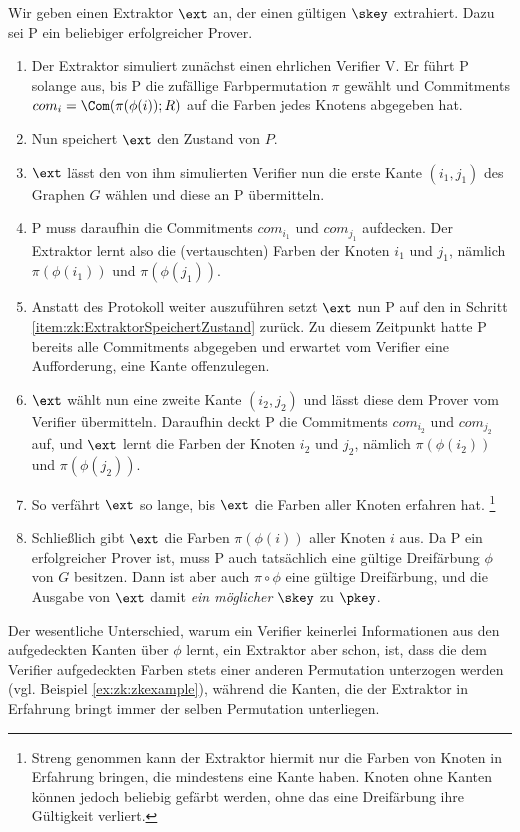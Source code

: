 \begin{beweis}
  Wir geben einen Extraktor $\ext$ an, der einen gültigen $\skey$ extrahiert. Dazu sei P ein beliebiger erfolgreicher Prover.
  
  \begin{enumerate}
  \item Der Extraktor simuliert zunächst einen ehrlichen Verifier V. Er
    führt P solange aus, bis P die zufällige Farbpermutation $\pi$
    gewählt und Commitments $com_i = \Com(\pi(\phi(i));R)$ auf die
    Farben jedes Knotens abgegeben hat.	 
  \item \label{item:zk:ExtraktorSpeichertZustand}
    Nun speichert $\ext$ den Zustand von $P$.
  \item $\ext$ lässt den von ihm simulierten Verifier nun die erste
    Kante $(i_1, j_1)$ des Graphen $G$ wählen und diese an P
    übermitteln.
  \item P muss daraufhin die Commitments $com_{i_1}$ und $com_{j_1}$
    aufdecken. Der Extraktor lernt also die (vertauschten) Farben der
    Knoten $i_1$ und $j_1$, nämlich $\pi(\phi(i_1))$ und
    $\pi(\phi(j_1))$.
  \item Anstatt des Protokoll weiter auszuführen setzt $\ext$ nun P auf
    den in Schritt \ref{item:zk:ExtraktorSpeichertZustand} zurück. Zu
    diesem Zeitpunkt hatte P bereits alle Commitments abgegeben und
    erwartet vom Verifier eine Aufforderung, eine Kante offenzulegen.
  \item $\ext$ wählt nun eine zweite Kante $(i_2, j_2)$ und lässt diese
    dem Prover vom Verifier übermitteln. Daraufhin deckt P die
    Commitments $com_{i_2}$ und $com_{j_2}$ auf, und $\ext$ lernt die
    Farben der Knoten $i_2$ und $j_2$, nämlich $\pi(\phi(i_2))$ und
    $\pi(\phi(j_2))$.
  \item So verfährt $\ext$ so lange, bis $\ext$ die Farben aller Knoten erfahren hat.
    \footnote{Streng genommen kann der Extraktor hiermit nur die Farben
      von Knoten in Erfahrung bringen, die mindestens eine Kante
      haben. Knoten ohne Kanten können jedoch beliebig gefärbt werden,
      ohne das eine Dreifärbung ihre Gültigkeit verliert.} 
  \item Schließlich gibt $\ext$ die Farben $\pi(\phi(i))$ aller Knoten
    $i$ aus. Da P ein erfolgreicher Prover ist, muss P auch tatsächlich
    eine gültige Dreifärbung $\phi$ von $G$ besitzen. Dann ist aber auch
    $\pi \circ \phi$ eine gültige Dreifärbung, und die Ausgabe von
    $\ext$ damit \emph{ein möglicher} $\skey$ zu $\pkey$.
  \end{enumerate}
\end{beweis}

Der wesentliche Unterschied, warum ein Verifier keinerlei Informationen
aus den aufgedeckten Kanten über $\phi$ lernt, ein Extraktor aber schon,
ist, dass die dem Verifier aufgedeckten Farben stets einer anderen
Permutation unterzogen werden (vgl. Beispiel \ref{ex:zk:zkexample}),
während die Kanten, die der Extraktor in Erfahrung bringt immer der
selben Permutation unterliegen. 
